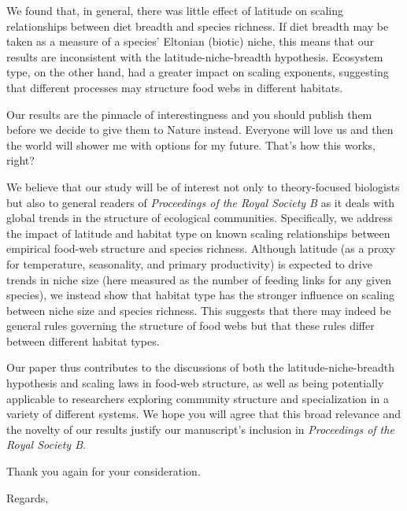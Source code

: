 \documentclass[12pt]{letter}
\newcommand{\myjournal}{\emph{Proceedings of the Royal Society B}}
\begin{document}
\begin{letter}
We found that, in general, there was little effect of latitude on scaling relationships between diet breadth and species richness. If diet breadth may be taken as a measure of a species' Eltonian (biotic) niche, this means that our results are inconsistent with the latitude-niche-breadth hypothesis. Ecosystem type, on the other hand, had a greater impact on scaling exponents, suggesting that different processes may structure food webs in different habitats. 

Our results are the pinnacle of interestingness and you should publish them before we decide to give them to Nature instead. Everyone will love us and then the world will shower me with options for my future. That's how this works, right?




We believe that our study will be of interest not only to theory-focused biologists but also to general readers
of \emph{\myjournal} as it deals with global trends in the structure of ecological communities. 
Specifically, we address the impact of latitude and habitat type on known scaling relationships between empirical
food-web structure and species richness. Although latitude (as a proxy for temperature, seasonality, and primary 
productivity) is expected to drive trends in niche size (here measured as the number of feeding links for any 
given species), we instead show that habitat type has the stronger influence on scaling between niche size and 
species richness. This suggests that there may indeed be general rules governing the structure of food webs but 
that these rules differ between different habitat types.


Our paper thus contributes to the discussions of both the latitude-niche-breadth hypothesis and scaling
laws in food-web structure, as well as being potentially applicable to researchers exploring community 
structure and specialization in a variety of different systems. We hope you will agree that this broad relevance
and the novelty of our results justify our manuscript's inclusion in \emph{\myjournal}.

Thank you again for your consideration.

\closing{Regards,}


\end{letter}


\end{document}
